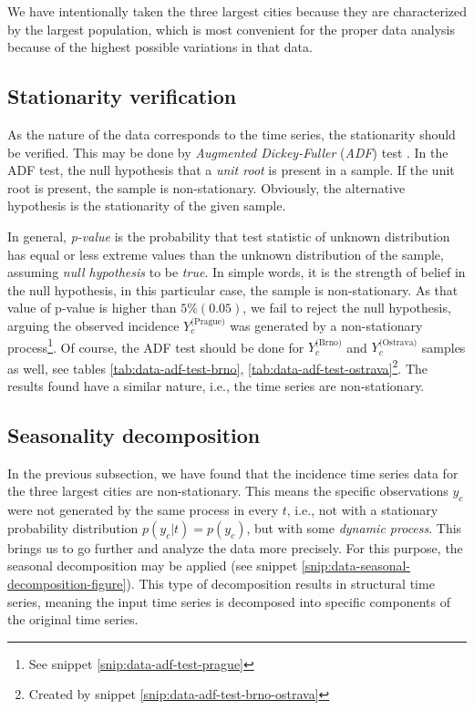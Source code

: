 \documentclass[
  digital, %
  oneside, %
  lof,     %
  lot,     %
]{fithesis4}
\begin{document}
We have intentionally taken the three largest cities because they are characterized by the largest population, which is most convenient for the proper data analysis because of the highest possible variations in that data.


\subsection{Stationarity verification}

As the nature of the data corresponds to the time series, the stationarity should be verified. 
This may be done by \textit{Augmented Dickey-Fuller} (\textit{ADF}) test \cite{dickey1979}. 
In the ADF test, the null hypothesis that a \textit{unit root} is present in a sample. 
If the unit root is present, the sample is non-stationary. 
Obviously, the alternative hypothesis is the stationarity of the given sample.



In general, \textit{p-value} is the probability that test statistic of unknown distribution has equal or less extreme values than the unknown distribution of the sample, assuming \textit{null hypothesis} to be \textit{true}.
In simple words, it is the strength of belief in the null hypothesis, in this particular case, the sample is non-stationary. 
As that value of p-value is higher than $5\% (0.05)$, we fail to reject the null hypothesis, arguing the observed incidence $Y_c^\text{(Prague)}$ was generated by a non-stationary process\footnote{See snippet \ref{snip:data-adf-test-prague}}. 
Of course, the ADF test should be done for $Y_c^\text{(Brno)}$ and $Y_c^\text{(Ostrava)}$ samples as well, see tables \ref{tab:data-adf-test-brno}, \ref{tab:data-adf-test-ostrava}\footnote{Created by snippet \ref{snip:data-adf-test-brno-ostrava}}.
The results found have a similar nature, i.e., the time series are non-stationary.

\subsection{Seasonality decomposition}
\label{sec:seasonality-decomposition}

In the previous subsection, we have found that the incidence time series data for the three largest cities are non-stationary. 
This means the specific observations $y_{c}$ were not generated by the same process in every $t$, i.e., not with a stationary probability distribution $p(y_c | t) = p(y_c)$, but with some \textit{dynamic process}. 
This brings us to go further and analyze the data more precisely. 
For this purpose, the seasonal decomposition may be applied (see snippet \ref{snip:data-seasonal-decomposition-figure}). 
This type of decomposition results in structural time series, meaning the input time series is decomposed into specific components of the original time series.
\end{document}
